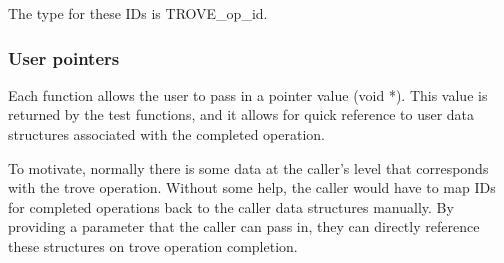 \documentclass[10pt]{article} %
\begin{document}
The type for these IDs is TROVE\_op\_id.

\subsubsection{User pointers}

Each function allows the user to pass in a pointer value (void *).  This value
is returned by the test functions, and it allows for quick reference to user
data structures associated with the completed operation.

To motivate, normally there is some data at the caller's level that
corresponds with the trove operation.  Without some help, the caller would
have to map IDs for completed operations back to the caller data structures
manually.  By providing a parameter that the caller can pass in, they can
directly reference these structures on trove operation completion.

%
%
\end{document}
